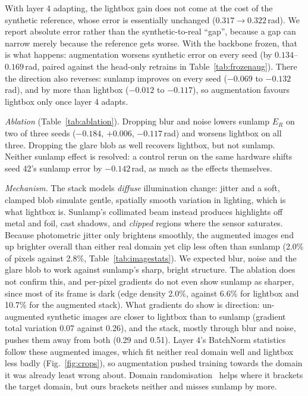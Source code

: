 \documentclass{article}
\newcommand{\Erot}{E_{R}}
\begin{document}
With layer 4 adapting, the lightbox gain does not come at the cost of the synthetic
reference, whose error is essentially unchanged ($0.317 \to 0.322$\,rad). We report absolute error rather than the
synthetic-to-real ``gap'', because a gap can narrow merely because the reference gets worse.
With the backbone frozen, that is what happens: augmentation worsens synthetic error on every
seed (by $0.134$--$0.169$\,rad, paired against the head-only retrains in
Table~\ref{tab:frozenaug}). There the direction also reverses: sunlamp improves on every seed
($-0.069$ to $-0.132$\,rad), and by more than lightbox ($-0.012$ to $-0.117$), so augmentation
favours lightbox only once layer 4 adapts.



\emph{Ablation} (Table~\ref{tab:ablation}). Dropping blur and noise lowers
sunlamp $\Erot$ on two of three seeds ($-0.184$, $+0.006$, $-0.117$\,rad) and worsens lightbox
on all three. Dropping the glare blob as well recovers lightbox, but not sunlamp. Neither
sunlamp effect is resolved: a control rerun on the same hardware shifts seed 42's sunlamp
error by $-0.142$\,rad, as much as the effects themselves.



\emph{Mechanism.} The stack models \emph{diffuse} illumination change: jitter and a soft,
clamped blob simulate gentle, spatially smooth variation in lighting, which is what lightbox
is. Sunlamp's collimated beam instead produces highlights off metal and foil, cast shadows, and
\emph{clipped} regions where the sensor saturates. Because photometric jitter only brightens
smoothly, the augmented images end up brighter overall than either real domain yet clip less
often than sunlamp (2.0\% of pixels against 2.8\%, Table~\ref{tab:imagestats}). We expected blur, noise and the glare blob
to work against sunlamp's sharp, bright structure. The ablation does not confirm this, and
per-pixel gradients do not even show sunlamp as sharper, since most of its frame is dark
(edge density 2.0\%, against 6.6\% for lightbox and 10.7\% for the augmented stack). What
gradients do show is direction: un-augmented synthetic images are closer to lightbox than to
sunlamp (gradient total variation 0.07 against 0.26), and the stack, mostly through blur and
noise, pushes them away from both (0.29 and 0.51). Layer 4's BatchNorm statistics follow these
augmented images, which fit neither real domain well and lightbox less badly
(Fig.~\ref{fig:crops}), so augmentation pushed training towards the domain it was already least
wrong about. Domain randomisation~\citep{tobin2017domainrand} helps where it brackets the
target domain, but ours brackets neither and misses sunlamp by more.
\end{document}
